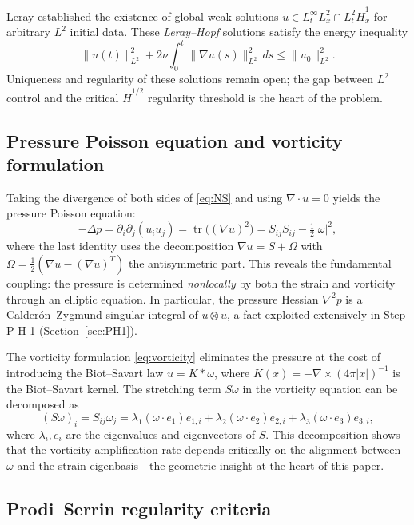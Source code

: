 \documentclass[11pt]{article}
\theoremstyle{definition}
\theoremstyle{remark}
\DeclareMathOperator{\tr}{tr}
\begin{document}
Leray \cite{Leray} established the existence of global weak solutions
$u \in L^\infty_t L^2_x \cap L^2_t \dot{H}^1_x$ for arbitrary $L^2$ initial data.
These \emph{Leray--Hopf} solutions satisfy the energy inequality
\[
  \|u(t)\|_{L^2}^2 + 2\nu \int_0^t \|\nabla u(s)\|_{L^2}^2\, ds
  \leq \|u_0\|_{L^2}^2.
\]
Uniqueness and regularity of these solutions remain open; the gap between $L^2$ control
and the critical $\dot{H}^{1/2}$ regularity threshold is the heart of the problem.

\subsection{Pressure Poisson equation and vorticity formulation}

Taking the divergence of both sides of \eqref{eq:NS} and using $\nabla \cdot u = 0$
yields the pressure Poisson equation:
\begin{equation}\label{eq:pressure-poisson}
  -\Delta p = \partial_i \partial_j (u_i u_j) = \tr\bigl((\nabla u)^2\bigr)
  = S_{ij}S_{ij} - \tfrac{1}{2}|\omega|^2,
\end{equation}
where the last identity uses the decomposition $\nabla u = S + \Omega$ with
$\Omega = \tfrac{1}{2}(\nabla u - (\nabla u)^T)$ the antisymmetric part.  This
reveals the fundamental coupling: the pressure is determined \emph{nonlocally}
by both the strain and vorticity through an elliptic equation.  In particular,
the pressure Hessian $\nabla^2 p$ is a Calder\'on--Zygmund singular integral of
$u \otimes u$, a fact exploited extensively in Step P-H-1 (Section~\ref{sec:PH1}).

The vorticity formulation \eqref{eq:vorticity} eliminates the pressure at the cost
of introducing the Biot--Savart law $u = K * \omega$, where $K(x) = -\nabla \times
(4\pi|x|)^{-1}$ is the Biot--Savart kernel.  The stretching term $S\omega$ in the
vorticity equation can be decomposed as
\begin{equation}\label{eq:stretching-decomp}
  (S\omega)_i = S_{ij}\omega_j
  = \lambda_1 (\omega \cdot e_1) e_{1,i} + \lambda_2 (\omega \cdot e_2) e_{2,i}
  + \lambda_3 (\omega \cdot e_3) e_{3,i},
\end{equation}
where $\lambda_i, e_i$ are the eigenvalues and eigenvectors of $S$.  This
decomposition shows that the vorticity amplification rate depends critically on
the alignment between $\omega$ and the strain eigenbasis---the geometric insight
at the heart of this paper.

\subsection{Prodi--Serrin regularity criteria}
\end{document}
